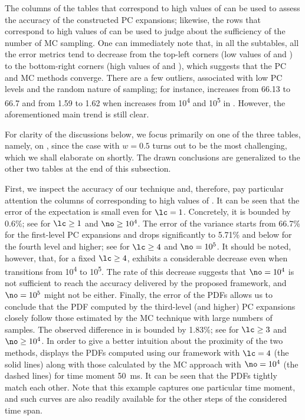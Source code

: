 The columns of the tables that correspond to high values of \no can be used to
assess the accuracy of the constructed \ac{PC} expansions; likewise, the rows
that correspond to high values of \lc can be used to judge about the sufficiency
of the number of \ac{MC} sampling. One can immediately note that, in all the
subtables, all the error metrics tend to decrease from the top-left corners (low
values of \lc and \ns) to the bottom-right corners (high values of \lc and \ns),
which suggests that the \ac{PC} and \ac{MC} methods converge. There are a few
outliers, associated with low \ac{PC} levels and the random nature of sampling;
for instance, \error{\variance} increases from 66.13 to 66.7 and  from
1.59 to 1.62 when \no increases from 10\textsuperscript{4} and
10\textsuperscript{5} in . However, the
aforementioned main trend is still clear.

For clarity of the discussions below, we focus primarily on one of the three
tables, namely, on , since the case with $w =
0.5$ turns out to be the most challenging, which we shall elaborate on shortly.
The drawn conclusions are generalized to the other two tables at the end of this
subsection.

First, we inspect the accuracy of our technique and, therefore, pay particular
attention the columns of  corresponding to
high values of \no. It can be seen that the error of the expectation is small
even for $\lc = 1$. Concretely, it is bounded by 0.6\%; see \error{\expectation}
for $\lc \geq 1$ and $\no \geq 10^4$. The error of the variance starts from
66.7\% for the first-level \ac{PC} expansions and drops significantly to 5.71\%
and below for the fourth level and higher; see \error{\variance} for $\lc \geq
4$ and $\no = 10^5$. It should be noted, however, that, for a fixed $\lc \geq
4$, \error{\variance} exhibits a considerable decrease even when \no transitions
from 10\textsuperscript{4} to 10\textsuperscript{5}. The rate of this decrease
suggests that $\no = 10^4$ is not sufficient to reach the accuracy delivered by
the proposed framework, and $\no = 10^5$ might not be either. Finally, the error
of the \acp{PDF} allows us to conclude that the \ac{PDF} computed by the
third-level (and higher) \ac{PC} expansions closely follow those estimated by
the \ac{MC} technique with large numbers of samples. The observed difference in
 is bounded by 1.83\%; see  for $\lc
\geq 3$ and $\no \geq 10^4$. In order to give a better intuition about the
proximity of the two methods,  displays the
\acp{PDF} computed using our framework with $\lc = 4$ (the solid lines) along
with those calculated by the \ac{MC} approach with $\no = 10^4$ (the dashed
lines) for time moment 50~ms. It can be seen that the \acp{PDF} tightly match
each other. Note that this example captures one particular time moment, and such
curves are also readily available for the other steps of the considered time
span.

